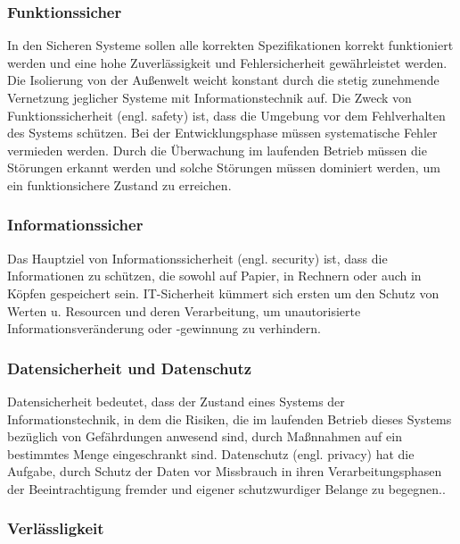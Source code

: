 \subsubsection{Funktionssicher}

In den Sicheren Systeme sollen alle korrekten Spezifikationen korrekt funktioniert werden und eine hohe Zuverlässigkeit und Fehlersicherheit gewährleistet werden. Die Isolierung von der Außenwelt weicht konstant durch die stetig zunehmende Vernetzung jeglicher Systeme mit Informationstechnik auf. Die Zweck von Funktionssicherheit (engl. safety) ist, dass die Umgebung vor dem Fehlverhalten des Systems schützen.  Bei der Entwicklungsphase müssen systematische Fehler vermieden werden. Durch die Überwachung im laufenden Betrieb müssen die Störungen erkannt werden und solche Störungen müssen dominiert werden, um ein funktionsichere Zustand zu erreichen\cite{hoepner2014trends}.

\subsubsection{Informationssicher}

Das Hauptziel von Informationssicherheit (engl. security) ist, dass die Informationen zu schützen, die sowohl auf Papier, in Rechnern oder auch in Köpfen gespeichert sein. IT-Sicherheit kümmert sich ersten um den Schutz von Werten u. Resourcen und deren Verarbeitung\cite[81]{int11sicher}, um unautorisierte Informationsveränderung oder -gewinnung zu verhindern\cite[26]{eckert2013sicherheit}.

\subsubsection{Datensicherheit und Datenschutz}

Datensicherheit bedeutet, dass der Zustand eines Systems der Informationstechnik, in dem die Risiken, die im laufenden Betrieb dieses Systems bezüglich von Gefährdungen anwesend sind, durch Maßnnahmen auf ein bestimmtes Menge eingeschrankt sind. Datenschutz (engl. privacy) hat die Aufgabe, durch Schutz der Daten vor Missbrauch in ihren Verarbeitungsphasen der Beeintrachtigung fremder und eigener schutzwurdiger Belange zu begegnen.\cite[14--15]{eberspacher1994sichere}.

\subsubsection{Verlässligkeit}

